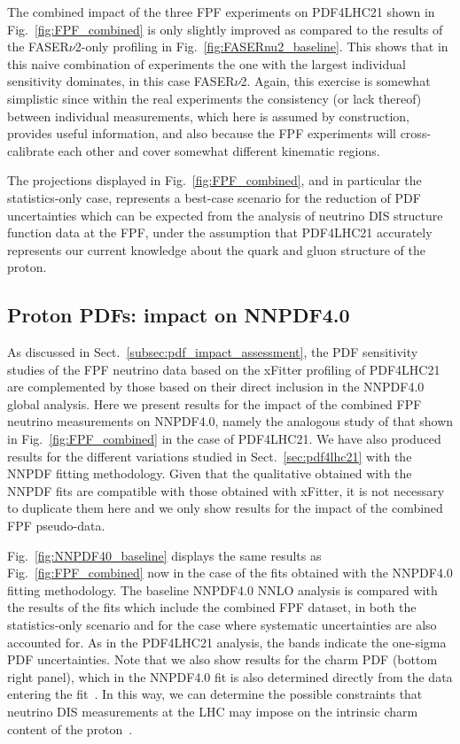 The combined impact of the three FPF experiments on PDF4LHC21 shown in Fig.~\ref{fig:FPF_combined}
is only slightly improved as compared to the results of the FASER$\nu$2-only profiling
in Fig.~\ref{fig:FASERnu2_baseline}.
%
This shows that in this naive combination of experiments the one with the largest individual
sensitivity dominates, in this case FASER$\nu$2.
%
Again, this exercise is somewhat simplistic since within the real experiments the consistency (or lack thereof) between
individual measurements, which here is assumed by construction, provides useful information, and also
because the FPF experiments will cross-calibrate each other and cover somewhat different kinematic regions.

The projections displayed in
Fig.~\ref{fig:FPF_combined}, and in particular the statistics-only case, represents
a best-case scenario for the reduction of PDF uncertainties which can be expected from
the analysis of neutrino DIS structure function data at the FPF,
under the assumption that PDF4LHC21 accurately represents
our current knowledge about the quark and gluon structure of the proton.

\subsection{Proton PDFs: impact on NNPDF4.0}
\label{sec:nnpdf40}

As discussed in Sect.~\ref{subsec:pdf_impact_assessment}, the PDF sensitivity
studies of the FPF neutrino data based on the {\sc\small xFitter} profiling
of PDF4LHC21 are complemented by those based on their direct inclusion
in the NNPDF4.0 global analysis.
%
Here we present results for the impact of the combined FPF neutrino
measurements on NNPDF4.0, namely the analogous study of that shown
in Fig.~\ref{fig:FPF_combined} in the case of PDF4LHC21.
%
We have also produced results for the different variations studied in
Sect.~\ref{sec:pdf4lhc21} with the NNPDF fitting methodology.
%
Given that the qualitative obtained with the NNPDF fits
are compatible with those obtained with {\sc\small xFitter}, it is not necessary to duplicate them here
and we only show results for the impact of the combined FPF pseudo-data.

Fig.~\ref{fig:NNPDF40_baseline} displays the
same results as Fig.~\ref{fig:FPF_combined} now in the case of the
fits obtained with the NNPDF4.0 fitting methodology.
%
The baseline NNPDF4.0 NNLO analysis is compared
with the results of the fits which include the combined FPF dataset,
in both the statistics-only scenario and for the case
where systematic uncertainties are also accounted for.
%
As in the PDF4LHC21 analysis, the bands indicate the one-sigma PDF uncertainties.
%
Note that we also show results for the charm PDF (bottom right panel), which
in the NNPDF4.0 fit is also determined directly from the data entering
the fit~\cite{Ball:2016neh}.
%
In this way, we can determine the possible constraints that neutrino
DIS measurements at the LHC may impose on the intrinsic charm
content of the proton~\cite{Ball:2022qks}.

